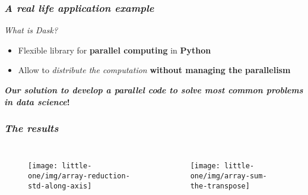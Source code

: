 \begin{frame}
  \frametitle{ \textit{A real life application
      example}}
  \begin{block}{ \textit{What is Dask?}}
    \begin{itemize}
      \itemsep0em
      \item Flexible library for \alert{\textbf{parallel computing}} in \alert{\textbf{Python}}
      \item Allow to \textit{distribute the computation} \textbf{without
          managing the parallelism}
    \end{itemize}
    \pause
  \end{block}
  \pause
  \vfill
  {
    \large
    \centering
     \textbf{\textit{Our solution to develop a parallel code
        to solve \alert{most common problems} in \alert{data science}}!}
  }
\end{frame}

\begin{frame}
  \frametitle{ \textit{The results}}
  \begin{columns}
    \begin{figure}
      \centering
      \texttt{[image: little-one/img/array-reduction-std-along-axis]}
    \end{figure}
    \begin{figure}
      \centering
      \texttt{[image: little-one/img/array-sum-the-transpose]}
    \end{figure}
  \end{columns}
\end{frame}
